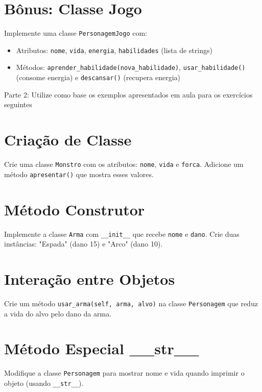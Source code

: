 \section{Bônus: Classe Jogo}
Implemente uma classe \texttt{PersonagemJogo} com:
\begin{itemize}
    \item Atributos: \texttt{nome}, \texttt{vida}, \texttt{energia}, \texttt{habilidades} (lista de strings)
    \item Métodos: \texttt{aprender\_habilidade(nova\_habilidade)}, \texttt{usar\_habilidade()} (consome energia) e \texttt{descansar()} (recupera energia)
\end{itemize}

\pagebreak

{\huge Parte 2: Utilize como base os exemplos apresentados em aula para os exercícios seguintes}


\section{Criação de Classe}
Crie uma classe \texttt{Monstro} com os atributos: \texttt{nome}, \texttt{vida} e \texttt{forca}. Adicione um método \texttt{apresentar()} que mostra esses valores.

\section{Método Construtor}
Implemente a classe \texttt{Arma} com \texttt{\_\_init\_\_} que recebe \texttt{nome} e \texttt{dano}. Crie duas instâncias: "Espada" (dano 15) e "Arco" (dano 10).


\section{Interação entre Objetos}
Crie um método \texttt{usar\_arma(self, arma, alvo)} na classe \texttt{Personagem} que reduz a vida do alvo pelo dano da arma.

\section{Método Especial \_\_str\_\_}
Modifique a classe \texttt{Personagem} para mostrar nome e vida quando imprimir o objeto (usando \texttt{\_\_str\_\_}).

